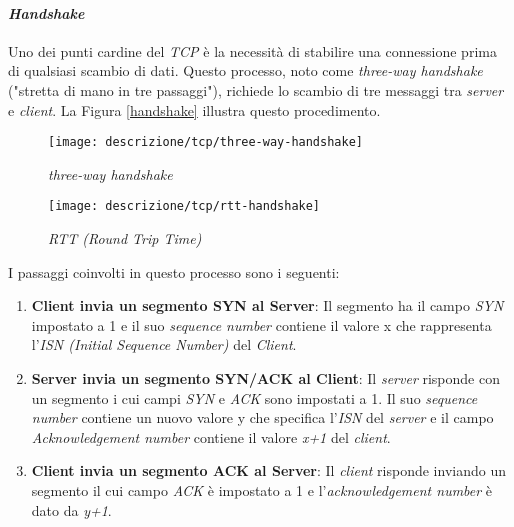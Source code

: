 \paragraph{\textit{Handshake}}

\noindent Uno dei punti cardine del \emph{TCP} è la necessità di stabilire una connessione prima di qualsiasi scambio di dati. Questo processo, noto come \emph{three-way handshake} ("stretta di mano in tre passaggi"), richiede lo scambio di tre messaggi tra \emph{server} e \emph{client}. La Figura \ref{handshake} illustra questo procedimento.

\begin{figure}[!h]
    \centering
    \begin{minipage}{0.48\textwidth}
        \centering
        \texttt{[image: descrizione/tcp/three-way-handshake]}
        \caption{\emph{three-way handshake}}
        \label{handshake}
    \end{minipage}
    \hfill
    \begin{minipage}{0.48\textwidth}
        \centering
        \texttt{[image: descrizione/tcp/rtt-handshake]}
        \caption{\emph{RTT (Round Trip Time)}}
        \label{rtt}
    \end{minipage}
\end{figure}

\noindent I passaggi coinvolti in questo processo sono i seguenti: 

\begin{enumerate}
    \item \textbf{Client invia un segmento SYN al Server}: Il segmento ha il campo \emph{SYN} impostato a 1 e il suo \emph{sequence number} contiene il valore x che rappresenta l'\emph{ISN (Initial Sequence Number)} del \emph{Client}.
    \item \textbf{Server invia un segmento SYN/ACK al Client}: Il \emph{server} risponde con un segmento i cui campi \emph{SYN} e \emph{ACK} sono impostati a 1. Il suo \emph{sequence number} contiene un nuovo valore y che specifica l'\emph{ISN} del \emph{server} e il campo \emph{Acknowledgement number} contiene il valore \emph{x+1} del \emph{client}.
    \item \textbf{Client invia un segmento ACK al Server}: Il \emph{client} risponde inviando un segmento il cui campo \emph{ACK} è impostato a 1 e l'\emph{acknowledgement number} è dato da \emph{y+1}.
\end{enumerate}

